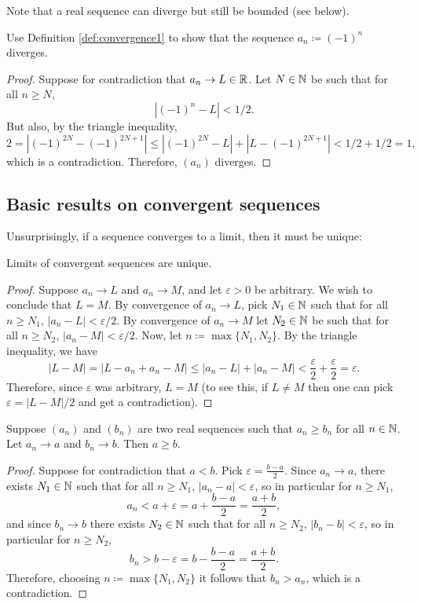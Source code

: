 \documentclass[../analysis1.tex]{subfiles}
\begin{document}
\begin{remark}
    Note that a real sequence can diverge but still be bounded (see below).
\end{remark}

\begin{example}
    Use Definition \ref{def:convergence1} to show that the sequence $a_n\coloneqq (-1)^n$ diverges.
\end{example}
\begin{proof}
    Suppose for contradiction that $a_n\to L\in \mathbb{R}$. Let $N\in\mathbb{N}$ be such that for all $n\ge N$, $$\left|(-1)^n-L\right|<1/2.$$
    But also, by the triangle inequality, $$2=\left|(-1)^{2N}-(-1)^{2N+1}\right|\le \left|(-1)^{2N}-L\right|+\left|L-(-1)^{2N+1}\right|<1/2+1/2=1,$$which is a contradiction.
    Therefore, $(a_n)$ diverges.\qedhere
\end{proof}

\subsection{Basic results on convergent sequences}
Unsurprisingly, if a sequence converges to a limit, then it must be unique:
\begin{theorem}
    \begin{shaded*}
        Limits of convergent sequences are unique.
    \end{shaded*}
\end{theorem}
\begin{proof}
    Suppose $a_n\to L$ and $a_n\to M$, and let $\varepsilon>0$ be arbitrary. We wish to conclude that $L=M$. By convergence of $a_n\to L$, pick $N_1\in\mathbb{N}$ such that for all $n\ge N_1$, $|a_n-L|<\varepsilon/2$.
    By convergence of $a_n\to M$ let $N_2\in\mathbb{N}$ be such that for all $n\ge N_2$, $|a_n-M|<\varepsilon/2$. Now, let $n\coloneqq \max\{N_1,N_2\}$. By the triangle inequality, we have
    $$|L-M|=|L-a_n+a_n-M|\le|a_n-L|+|a_n-M|<\frac{\varepsilon}{2}+\frac{\varepsilon}{2}=\varepsilon.$$
    Therefore, since $\varepsilon$ was arbitrary, $L=M$ (to see this, if $L\ne M$ then one can pick $\varepsilon=|L-M|/2$ and get a contradiction).\qedhere
\end{proof}

\begin{theorem}
\label{thm:olt}
    \begin{shaded*}
        Suppose $(a_n)$ and $(b_n)$ are two real sequences such that $a_n\ge b_n$ for all $n\in\mathbb{N}$. Let $a_n\to a$ and $b_n\to b$. Then $a\ge b$.
    \end{shaded*}
\end{theorem}
\begin{proof}
    Suppose for contradiction that $a<b$. Pick $\varepsilon=\frac{b-a}{2}$. Since $a_n\to a$, there exists $N_1\in\mathbb{N}$ such that for all $n\ge N_1$, $|a_n-a|<\varepsilon$, so in particular for $n\ge N_1$, $$a_n<a+\varepsilon=a+\frac{b-a}{2}=\frac{a+b}{2},$$
    and since $b_n\to b$ there exists $N_2\in\mathbb{N}$ such that for all $n\ge N_2$, $|b_n-b|<\varepsilon$, so in particular for $n\ge N_2$, $$b_n>b-\varepsilon=b-\frac{b-a}{2}=\frac{a+b}{2}.$$Therefore, choosing $n\coloneqq\max\{N_1,N_2\}$ it follows that $b_n>a_n$, which is a contradiction.\qedhere
\end{proof}
\end{document}

